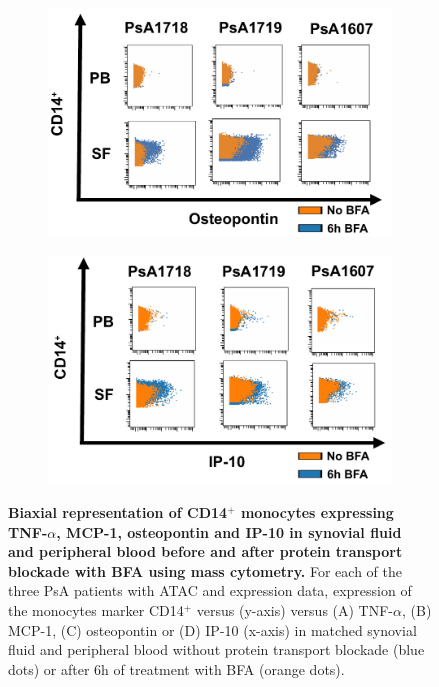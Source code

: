 \begin{figure}[H]
\begin{subfigure}[b]{0.45\textwidth}
\includegraphics[width=\textwidth]{./Results3/pdfs/PSA_0h_6h_BFA_osteopontin_mass_cytometry_PSA1718_PSA1719_PSA1607}
\caption{}
\end{subfigure}%
\begin{subfigure}[b]{0.45\textwidth} 
\centering
\includegraphics[width=\textwidth]{./Results3/pdfs/PSA_0h_6h_BFA_IP10_mass_cytometry_PSA1718_PSA1719_PSA1607}
\caption{}
\end{subfigure}
\caption[Biaxial representation of CD14$^+$ monocytes expressing TNF-$\alpha$, MCP-1, osteopontin and IP-10 in synovial fluid and peripheral blood before and after protein transport blockade with BFA using mass cytometry.]{\textbf{Biaxial representation of CD14$^+$ monocytes expressing TNF-$\alpha$, MCP-1, osteopontin and IP-10 in synovial fluid and peripheral blood before and after protein transport blockade with BFA using mass cytometry.} For each of the three PsA patients with ATAC and expression data, expression of the monocytes marker CD14$^+$ versus (y-axis) versus (A) TNF-$\alpha$, (B) MCP-1, (C) osteopontin or (D) IP-10 (x-axis) in matched synovial fluid and peripheral blood without protein transport blockade (blue dots) or after 6h of treatment with BFA (orange dots).}
\label{figure:PsA_monocytes_biaxial_TNFa_MCP1_osteopontin_IP10}
\end{figure}




